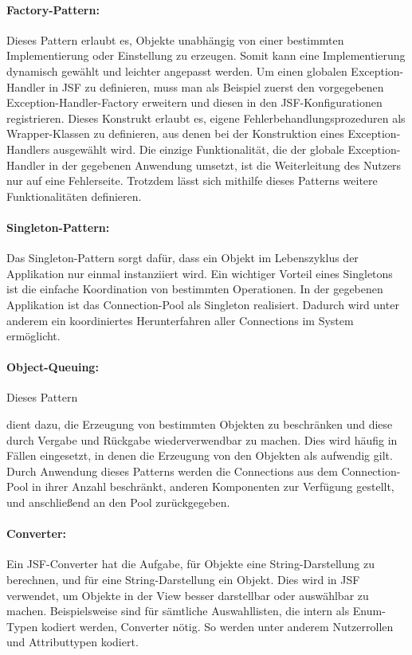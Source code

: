 \documentclass{article}
\begin{document}
\paragraph{Factory-Pattern:}
Dieses Pattern erlaubt es, Objekte unabhängig von einer bestimmten Implementierung oder Einstellung zu erzeugen. Somit kann eine Implementierung dynamisch gewählt und leichter angepasst werden.
Um einen globalen Exception-Handler in JSF zu definieren, muss man als Beispiel zuerst den vorgegebenen Exception-Handler-Factory erweitern und diesen in den JSF-Konfigurationen registrieren.
Dieses Konstrukt erlaubt es, eigene Fehlerbehandlungsprozeduren als Wrapper-Klassen zu definieren, aus denen bei der Konstruktion eines Exception-Handlers ausgewählt wird.
Die einzige Funktionalität, die der globale Exception-Handler in der gegebenen Anwendung umsetzt, ist die Weiterleitung des Nutzers nur auf eine Fehlerseite. Trotzdem lässt sich mithilfe dieses Patterns weitere Funktionalitäten definieren.

\paragraph{Singleton-Pattern:}
Das Singleton-Pattern sorgt dafür, dass ein Objekt im Lebenszyklus der Applikation nur einmal instanziiert wird. Ein wichtiger Vorteil eines Singletons ist die einfache Koordination von bestimmten Operationen.
In der gegebenen Applikation ist das Connection-Pool als Singleton realisiert. Dadurch wird unter anderem ein koordiniertes Herunterfahren aller Connections im System ermöglicht.

\paragraph{Object-Queuing:}
\hypertarget{Pooling}{Dieses Pattern} dient dazu, die Erzeugung von bestimmten Objekten zu beschränken und diese durch Vergabe und Rückgabe wiederverwendbar zu machen. Dies wird häufig in Fällen eingesetzt, in denen die Erzeugung von den Objekten als aufwendig gilt.
Durch Anwendung dieses Patterns werden die Connections aus dem Connection-Pool in ihrer Anzahl beschränkt, anderen Komponenten zur Verfügung gestellt, und anschließend an den Pool zurückgegeben.

\paragraph{Converter:}
Ein JSF-Converter hat die Aufgabe, für Objekte eine String-Darstellung zu berechnen, und für eine String-Darstellung ein Objekt. Dies wird in JSF verwendet, um Objekte in der View besser darstellbar oder auswählbar zu machen.
Beispielsweise sind für sämtliche Auswahllisten, die intern als Enum-Typen kodiert werden, Converter nötig. So werden unter anderem Nutzerrollen und Attributtypen kodiert.
\end{document}
